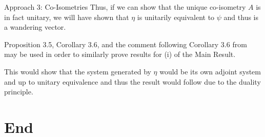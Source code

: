 \documentclass{beamer}
\begin{document}
\begin{frame}{Approach 3: Co-Isometries}
 Thus, if we can show that the unique co-isometry $A$ is in fact unitary, we will have shown that $\eta$ is unitarily equivalent to $\psi$ and thus is a wandering vector. 
 
    Proposition 3.5, Corollary 3.6, and the comment following Corollary 3.6 from \textbf{\cite{HL2000}} may be used in order to similarly prove results for (i) of the Main Result. 

This would show that the system generated by $\eta$ would be its own adjoint system and up to unitary equivalence and thus the result would follow due to the duality principle.
\end{frame}

\section[Thank You]{End}

\begin{frame}[allowframebreaks]
        \printbibliography
\end{frame}
\end{document}
